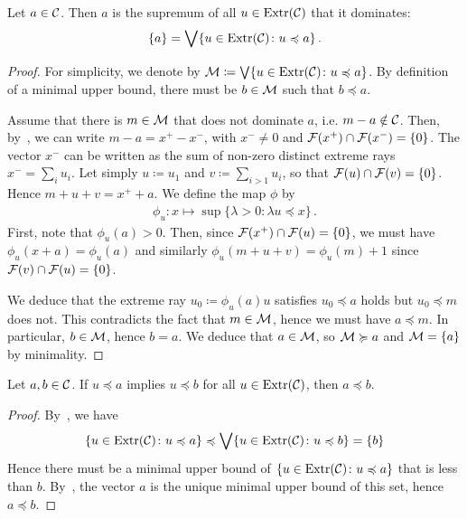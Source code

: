 \documentclass[main]{subfiles}
\begin{document}
\begin{lemma}
\label{lem:extr_mub_a}
Let $a \in \mathcal{C}$. Then $a$ is the supremum of all $u \in \operatorname{Extr}(\mathcal{C})$ that it dominates:
\begin{align*}
\{a \} = \bigvee \{ u \in \operatorname{Extr}(\mathcal{C}) \colon u \preccurlyeq a \} \,.
\end{align*}
\end{lemma}
\begin{proof}
For simplicity, we denote by $\mathcal{M} \coloneqq \bigvee \{ u \in \operatorname{Extr}(\mathcal{C}) \colon u \preccurlyeq a \}$. By definition of a minimal upper bound, there must be $b \in \mathcal{M}$ such that $b \preceq a$.

Assume that there is $m \in \mathcal{M}$ that does not dominate $a$, i.e. $m-a \notin \mathcal{C}$.  Then, by~, we can write $m-a = x^+-x^-$, with $x^- \neq 0$ and $\mathcal{F}(x^+) \cap \mathcal{F}(x^-) = \{ 0\}$. The vector $x^-$ can be written as the sum of non-zero distinct extreme rays $x^- = \sum_i u_i$. Let simply $u \coloneqq u_1$ and $v \coloneqq \sum_{i>1} u_i$, so that $\mathcal{F}(u) \cap \mathcal{F}(v) = \{0\}$. Hence $m+u+v = x^+ +a$. 
We define the map $\phi$ by
\begin{align*}
\phi_u \colon x \mapsto \sup \{ \lambda > 0 \colon \lambda u \preceq x \} \,.
\end{align*}
First, note that $\phi_u(a) > 0$.
Then, since $\mathcal{F}(x^+) \cap \mathcal{F}(u) = \{0\}$, we must have $\phi_u(x+a) = \phi_u(a)$ and similarly $\phi_u(m+u+v) = \phi_u(m) + 1$ since $\mathcal{F}(v) \cap \mathcal{F}(u) = \{0\}$. 

We deduce that the extreme ray $u_0 \coloneqq \phi_u(a) u$ satisfies $u_0 \preceq a$ holds but $u_0 \preceq m$ does not. 
 This contradicts the fact that $m \in \mathcal{M}$, hence we must have $a \preceq m$.
In particular, $b \in \mathcal{M}$, hence $b = a$. We deduce that $a \in \mathcal{M}$, so $\mathcal{M} \succcurlyeq a$ and $\mathcal{M} = \{a\}$ by minimality.
\end{proof}

\begin{lemma}
\label{lem:preceq_extr_mon}
Let $a, b \in \mathcal{C}$.
If $u \preceq a$ implies $u \preceq b$ for all $u \in \operatorname{Extr}(\mathcal{C})$, then $a \preceq b$.
\end{lemma}
\begin{proof}
By~, we have
\begin{align*}
\{ u \in \operatorname{Extr}(\mathcal{C}) \colon u \preccurlyeq a \} \preccurlyeq \bigvee \{ u \in \operatorname{Extr}(\mathcal{C}) \colon u \preccurlyeq b \} = \{ b \}
\end{align*}
Hence there must be a minimal upper bound of $\{ u \in \operatorname{Extr}(\mathcal{C}) \colon u \preccurlyeq a \}$ that is less than $b$. By~, the vector $a$ is the unique minimal upper bound of this set, hence $a \preceq b$.
\end{proof}
\end{document}
